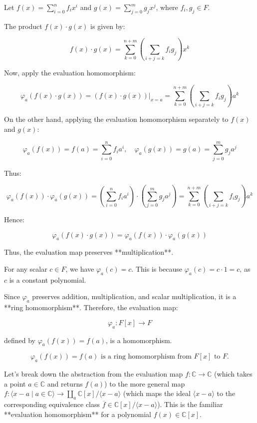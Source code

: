 \documentclass[11pt,openany]{article}
\begin{document}

Let \( f(x) = \sum_{i=0}^{n} f_i x^i \) and \( g(x) = \sum_{j=0}^{m} g_j x^j \), where \( f_i, g_j \in F \).

The product \( f(x) \cdot g(x) \) is given by:

\[
f(x) \cdot g(x) = \sum_{k=0}^{n+m} \left( \sum_{i+j=k} f_i g_j \right) x^k
\]

Now, apply the evaluation homomorphism:

\[
\varphi_a(f(x) \cdot g(x)) = (f(x) \cdot g(x))\big|_{x=a} = \sum_{k=0}^{n+m} \left( \sum_{i+j=k} f_i g_j \right) a^k
\]

On the other hand, applying the evaluation homomorphism separately to \( f(x) \) and \( g(x) \):

\[
\varphi_a(f(x)) = f(a) = \sum_{i=0}^{n} f_i a^i, \quad \varphi_a(g(x)) = g(a) = \sum_{j=0}^{m} g_j a^j
\]

Thus:

\[
\varphi_a(f(x)) \cdot \varphi_a(g(x)) = \left( \sum_{i=0}^{n} f_i a^i \right) \cdot \left( \sum_{j=0}^{m} g_j a^j \right) = \sum_{k=0}^{n+m} \left( \sum_{i+j=k} f_i g_j \right) a^k
\]

Hence:

\[
\varphi_a(f(x) \cdot g(x)) = \varphi_a(f(x)) \cdot \varphi_a(g(x))
\]

Thus, the evaluation map preserves **multiplication**.


For any scalar \( c \in F \), we have \( \varphi_a(c) = c \). This is because \( \varphi_a(c) = c \cdot 1 = c \), as \( c \) is a constant polynomial.


Since \( \varphi_a \) preserves addition, multiplication, and scalar multiplication, it is a **ring homomorphism**. Therefore, the evaluation map:

\[
\varphi_a : F[x] \to F
\]

defined by \( \varphi_a(f(x)) = f(a) \), is a homomorphism.


\[
\boxed{\varphi_a(f(x)) = f(a) \text{ is a ring homomorphism from } F[x] \text{ to } F.}
\]

\newpage

Let's break down the abstraction from the evaluation map \( f: \mathbb{C} \to \mathbb{C} \) (which takes a point \( a \in \mathbb{C} \) and returns \( f(a) \)) to the more general map \( f: \langle x - a \mid a \in \mathbb{C} \rangle \to \coprod_a \mathbb{C}[x] / \langle x - a \rangle \) (which maps the ideal \( \langle x - a \rangle \) to the corresponding equivalence class \( \overline{f} \in \mathbb{C}[x] / \langle x - a \rangle \)).
%
%
This is the familiar **evaluation homomorphism** for a polynomial \( f(x) \in \mathbb{C}[x] \).
\end{document}
